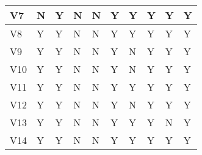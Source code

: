 \begin{table}[ht]
\begin{tabular}{|l|l|l|l|l|l|l|l|l|l|}
    V7                       & \cellcolor[HTML]{FFE7E6}N & \cellcolor[HTML]{D6FDD5}Y & \cellcolor[HTML]{FFE7E6}N & \cellcolor[HTML]{FFE7E6}N & \cellcolor[HTML]{D6FDD5}Y & \cellcolor[HTML]{D6FDD5}Y & \cellcolor[HTML]{D6FDD5}Y & \cellcolor[HTML]{D6FDD5}Y & \cellcolor[HTML]{D6FDD5}Y \\ \hline
    V8                       & \cellcolor[HTML]{D6FDD5}Y & \cellcolor[HTML]{D6FDD5}Y & \cellcolor[HTML]{FFE7E6}N & \cellcolor[HTML]{FFE7E6}N & \cellcolor[HTML]{D6FDD5}Y & \cellcolor[HTML]{D6FDD5}Y & \cellcolor[HTML]{D6FDD5}Y & \cellcolor[HTML]{D6FDD5}Y & \cellcolor[HTML]{D6FDD5}Y \\ \hline
    V9                       & \cellcolor[HTML]{D6FDD5}Y & \cellcolor[HTML]{D6FDD5}Y & \cellcolor[HTML]{FFE7E6}N & \cellcolor[HTML]{FFE7E6}N & \cellcolor[HTML]{D6FDD5}Y & \cellcolor[HTML]{FFE7E6}N & \cellcolor[HTML]{D6FDD5}Y & \cellcolor[HTML]{D6FDD5}Y & \cellcolor[HTML]{D6FDD5}Y \\ \hline
    V10                      & \cellcolor[HTML]{D6FDD5}Y & \cellcolor[HTML]{D6FDD5}Y & \cellcolor[HTML]{FFE7E6}N & \cellcolor[HTML]{FFE7E6}N & \cellcolor[HTML]{D6FDD5}Y & \cellcolor[HTML]{FFE7E6}N & \cellcolor[HTML]{D6FDD5}Y & \cellcolor[HTML]{D6FDD5}Y & \cellcolor[HTML]{D6FDD5}Y \\ \hline
    V11                      & \cellcolor[HTML]{D6FDD5}Y & \cellcolor[HTML]{D6FDD5}Y & \cellcolor[HTML]{FFE7E6}N & \cellcolor[HTML]{FFE7E6}N & \cellcolor[HTML]{D6FDD5}Y & \cellcolor[HTML]{D6FDD5}Y & \cellcolor[HTML]{D6FDD5}Y & \cellcolor[HTML]{D6FDD5}Y & \cellcolor[HTML]{D6FDD5}Y \\ \hline
    V12                      & \cellcolor[HTML]{D6FDD5}Y & \cellcolor[HTML]{D6FDD5}Y & \cellcolor[HTML]{FFE7E6}N & \cellcolor[HTML]{FFE7E6}N & \cellcolor[HTML]{D6FDD5}Y & \cellcolor[HTML]{FFE7E6}N & \cellcolor[HTML]{D6FDD5}Y & \cellcolor[HTML]{D6FDD5}Y & \cellcolor[HTML]{D6FDD5}Y \\ \hline
    V13                      & \cellcolor[HTML]{D6FDD5}Y & \cellcolor[HTML]{D6FDD5}Y & \cellcolor[HTML]{FFE7E6}N & \cellcolor[HTML]{FFE7E6}N & \cellcolor[HTML]{D6FDD5}Y & \cellcolor[HTML]{D6FDD5}Y & \cellcolor[HTML]{D6FDD5}Y & \cellcolor[HTML]{FFE7E6}N & \cellcolor[HTML]{D6FDD5}Y \\ \hline
    V14                      & \cellcolor[HTML]{D6FDD5}Y & \cellcolor[HTML]{D6FDD5}Y & \cellcolor[HTML]{FFE7E6}N & \cellcolor[HTML]{FFE7E6}N & \cellcolor[HTML]{D6FDD5}Y & \cellcolor[HTML]{D6FDD5}Y & \cellcolor[HTML]{D6FDD5}Y & \cellcolor[HTML]{D6FDD5}Y & \cellcolor[HTML]{D6FDD5}Y \\ \hline

\end{tabular}
\end{table}
